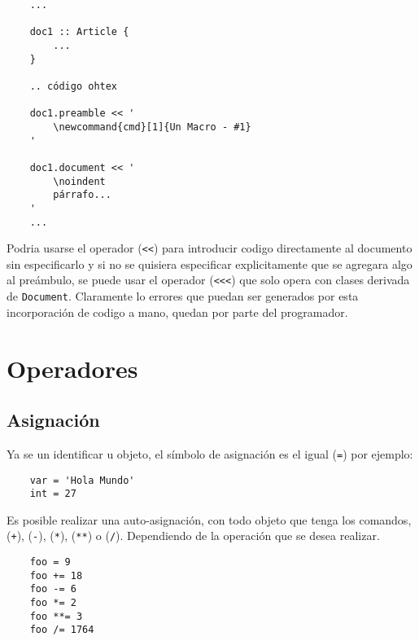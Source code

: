 \documentclass[12pt,letterpaper,titlepage,oneside,openright]{book}
\begin{document}
\begin{center}
\begin{minipage}{\linewidth}
\begin{lstlisting}
    ...

    doc1 :: Article {
        ...
    }

    .. código ohtex

    doc1.preamble << '
        \newcommand{cmd}[1]{Un Macro - #1}
    '

    doc1.document << '
        \noindent
        párrafo...
    '
    ...
\end{lstlisting}
\end{minipage}
\end{center}

Podria usarse el operador (\verb$<<$) para introducir codigo directamente al documento sin especificarlo y si no se quisiera especificar explicitamente que se agregara algo al preámbulo, se puede usar el operador (\verb$<<<$) que solo opera con clases derivada de \texttt{Document}. Claramente lo errores que puedan ser generados por esta incorporación de codigo a mano, quedan por parte del programador.

\section{Operadores}

\subsection{Asignación}

Ya se un identificar u objeto, el símbolo de asignación es el igual (\texttt{=}) por ejemplo:

\begin{center}
\begin{minipage}{\linewidth}
\begin{lstlisting}
    var = 'Hola Mundo'
    int = 27
\end{lstlisting}
\end{minipage}
\end{center}

Es posible realizar una auto-asignación, con todo objeto que tenga los comandos, (\texttt{+}), (\texttt{-}), (\texttt{*}), (\texttt{**}) o (\texttt{/}). Dependiendo de la operación que se desea realizar.

\begin{center}
\begin{minipage}{\linewidth}
\begin{lstlisting}
    foo = 9
    foo += 18
    foo -= 6
    foo *= 2
    foo **= 3
    foo /= 1764  
\end{lstlisting}
\end{minipage}
\end{center}
\end{document}
